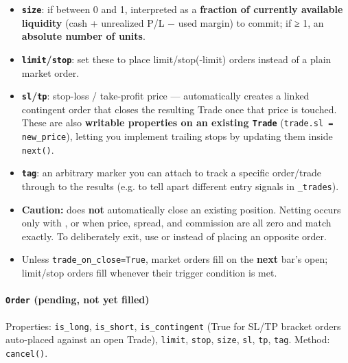 \documentclass[12pt,openany]{book}
\theoremstyle{definition}
\theoremstyle{remark}
\begin{document}
\begin{itemize}
\item 
\textbf{\texttt{size}}: if between 0 and 1, interpreted as a \textbf{fraction of currently available liquidity} (cash + unrealized P/L − used margin) to commit; if ≥ 1, an \textbf{absolute number of units}.

\item 
\textbf{\texttt{limit}/\texttt{stop}}: set these to place limit/stop(-limit) orders instead of a plain market order.

\item 
\textbf{\texttt{sl}/\texttt{tp}}: stop-loss / take-profit price — automatically creates a linked contingent order that closes the resulting Trade once that price is touched. These are also \textbf{writable properties on an existing \texttt{Trade}} (\texttt{trade.sl = new\_price}), letting you implement trailing stops by updating them inside \texttt{next()}.

\item 
\textbf{\texttt{tag}}: an arbitrary marker you can attach to track a specific order/trade through to the results (e.g. to tell apart different entry signals in \texttt{\_trades}).

\item 
\textbf{Caution:}  does \textbf{not} automatically
close an existing  position. Netting occurs only with
, or when price, spread, and commission are all
zero and match exactly. To deliberately exit, use  or
 instead of placing an opposite order.

\item 
Unless \texttt{trade\_on\_close=True}, market orders fill on the \textbf{next} bar's open; limit/stop orders fill whenever their trigger condition is met.

\end{itemize}

\paragraph{\texttt{Order} (pending, not yet filled)}

Properties: \texttt{is\_long}, \texttt{is\_short}, \texttt{is\_contingent} (True for SL/TP bracket orders auto-placed against an open Trade), \texttt{limit}, \texttt{stop}, \texttt{size}, \texttt{sl}, \texttt{tp}, \texttt{tag}. Method: \texttt{cancel()}.
\end{document}

